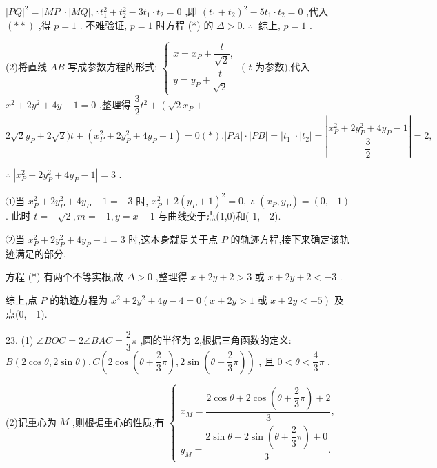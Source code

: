 ${\left| PQ\right| }^{2} = \left| {MP}\right|  \cdot  \left| {MQ}\right| ,\therefore {t}_{1}^{2} + {t}_{2}^{2} - 3{t}_{1} \cdot  {t}_{2} = 0$ ,即 ${\left( {t}_{1} + {t}_{2}\right) }^{2} - 5{t}_{1} \cdot  {t}_{2} = 0$ ,代入 $\left( {* * }\right)$ ,得 $p = 1$ . 不难验证, $p = 1$ 时方程 (*) 的 $\Delta  > 0.\;\therefore \;$ 综上, $p = 1$ .

(2)将直线 ${AB}$ 写成参数方程的形式: $\left\{  \begin{array}{l} x = {x}_{P} + \dfrac{t}{\sqrt{2}}, \\  y = {y}_{P} + \dfrac{t}{\sqrt{2}} \end{array}\right.$ ( $t$ 为参数),代入 ${x}^{2} + 2{y}^{2} + {4y} - 1 = 0$ ,整理得 $\dfrac{3}{2}{t}^{2} + \left( {\sqrt{2}{x}_{P} + }\right.$  $2\sqrt{2}{y}_{P} + 2\sqrt{2})t + \left( {{x}_{P}^{2} + 2{y}_{P}^{2} + 4{y}_{P} - 1}\right)  = 0\left( *\right) .\left| {PA}\right|  \cdot  \left| {PB}\right|  = \left| {t}_{1}\right|  \cdot  \left| {t}_{2}\right|  = \left| \dfrac{{x}_{P}^{2} + 2{y}_{P}^{2} + 4{y}_{P} - 1}{\dfrac{3}{2}}\right|  = 2,$

$\therefore \;\left| {{x}_{P}^{2} + 2{y}_{P}^{2} + 4{y}_{P} - 1}\right|  = 3$ .

①当 ${x}_{P}^{2} + 2{y}_{P}^{2} + 4{y}_{P} - 1 =  - 3$ 时, ${x}_{P}^{2} + 2{\left( {y}_{P} + 1\right) }^{2} = 0,\;\therefore \;\left( {{x}_{P},{y}_{P}}\right)  = \left( {0, - 1}\right)$ . 此时 $t =  \pm  \sqrt{2},m =  - 1,y = x - 1$ 与曲线交于点(1,0)和(-1, - 2).

②当 ${x}_{P}^{2} + 2{y}_{P}^{2} + 4{y}_{P} - 1 = 3$ 时,这本身就是关于点 $P$ 的轨迹方程,接下来确定该轨迹满足的部分.

方程 (*) 有两个不等实根,故 $\Delta  > 0$ ,整理得 $x + {2y} + 2 > 3$ 或 $x + {2y} + 2 <  - 3$ .

综上,点 $P$ 的轨迹方程为 ${x}^{2} + 2{y}^{2} + {4y} - 4 = 0\left( {x + {2y} > 1\text{ 或 }x + {2y} <  - 5}\right)$ 及点(0, - 1).

23. (1) $\angle {BOC} = 2\angle {BAC} = \dfrac{2}{3}\pi$ ,圆的半径为 2,根据三角函数的定义: $B\left( {2\cos \theta ,2\sin \theta }\right) ,C\left( {2\cos \left( {\theta  + \dfrac{2}{3}\pi }\right) ,2\sin \left( {\theta  + \dfrac{2}{3}\pi }\right) }\right)$ , 且 $0 < \theta  < \dfrac{4}{3}\pi$ .

(2)记重心为 $M$ ,则根据重心的性质,有 $\left\{  \begin{array}{l} {x}_{M} = \dfrac{2\cos \theta  + 2\cos \left( {\theta  + \dfrac{2}{3}\pi }\right)  + 2}{3}, \\  {y}_{M} = \dfrac{2\sin \theta  + 2\sin \left( {\theta  + \dfrac{2}{3}\pi }\right)  + 0}{3}. \end{array}\right.$

